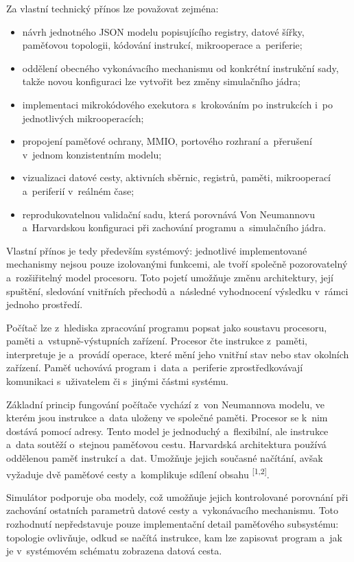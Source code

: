 \documentclass[hidelinks, 12pt]{article}%
\begin{document}
Za vlastní technický přínos lze považovat zejména:
\begin{itemize}
\item návrh jednotného JSON modelu popisujícího registry, datové šířky, paměťovou topologii, kódování instrukcí, mikrooperace a~periferie;
\item oddělení obecného vykonávacího mechanismu od konkrétní instrukční sady, takže novou konfiguraci lze vytvořit bez změny simulačního jádra;
\item implementaci mikrokódového exekutora s~krokováním po instrukcích i~po jednotlivých mikrooperacích;
\item propojení paměťové ochrany, MMIO, portového rozhraní a~přerušení v~jednom konzistentním modelu;
\item vizualizaci datové cesty, aktivních sběrnic, registrů, paměti, mikrooperací a~periferií v~reálném čase;
\item reprodukovatelnou validační sadu, která porovnává Von Neumannovu a~Harvardskou konfiguraci při zachování programu a~simulačního jádra.
\end{itemize}

Vlastní přínos je tedy především systémový: jednotlivé implementované mechanismy nejsou pouze izolovanými funkcemi, ale tvoří společně pozorovatelný a~rozšiřitelný model procesoru. Toto pojetí umožňuje změnu architektury, její spuštění, sledování vnitřních přechodů a~následné vyhodnocení výsledku v~rámci jednoho prostředí.

Počítač lze z~hlediska zpracování programu popsat jako soustavu procesoru, paměti a~vstupně-výstupních zařízení. Procesor čte instrukce z~paměti, interpretuje je a~provádí operace, které mění jeho vnitřní stav nebo stav okolních zařízení. Paměť uchovává program i~data a~periferie zprostředkovávají komunikaci s~uživatelem či s~jinými částmi systému.

Základní princip fungování počítače vychází z~von Neumannova modelu, ve kterém jsou instrukce a~data uloženy ve společné paměti. Procesor se k~nim dostává pomocí adresy. Tento model je jednoduchý a~flexibilní, ale instrukce a~data soutěží o~stejnou paměťovou cestu. Harvardská architektura používá oddělenou paměť instrukcí a~dat. Umožňuje jejich současné načítání, avšak vyžaduje dvě paměťové cesty a~komplikuje sdílení obsahu \textsuperscript{[1,2]}.

Simulátor podporuje oba modely, což umožňuje jejich kontrolované porovnání při zachování ostatních parametrů datové cesty a~vykonávacího mechanismu. Toto rozhodnutí nepředstavuje pouze implementační detail paměťového subsystému: topologie ovlivňuje, odkud se načítá instrukce, kam lze zapisovat program a~jak je v~systémovém schématu zobrazena datová cesta.
\end{document}
